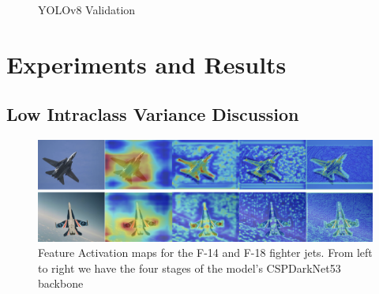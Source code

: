 \documentclass[10pt,twocolumn,letterpaper]{article}
\begin{document}
\begin{figure}[h]
    \centering
    \qquad
    \caption{YOLOv8 Validation}%
    \label{fig:Model_Evaluation}
\end{figure}

\section{Experiments and Results}
\subsection{Low Intraclass Variance Discussion}

\begin{figure}[h]
    \centering
    \includegraphics[width=1.0\textwidth]{figures/F14vsF18.png}
    \caption{Feature Activation maps for the F-14 and F-18 fighter jets. From left to right we have the four stages of the model’s
CSPDarkNet53 backbone}
    \label{fig:F14vsF18}
\end{figure}
\end{document}
